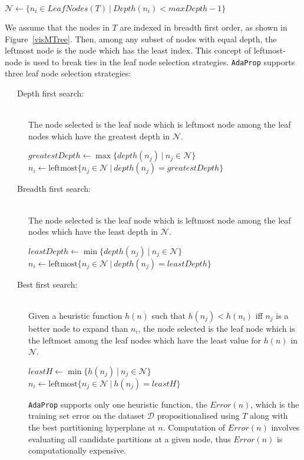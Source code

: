 \documentclass[a4paper,12pt]{report} %
\newcommand{\AdaProp}{\texttt{AdaProp}\xspace}
\newcommand{\mcl}[1]{\mathcal{#1}}
\begin{document}
\begin{algorithmic}
    \State $\mcl{N} \gets \{ n_i \in LeafNodes(T) ~\big|~ Depth(n_i) < maxDepth - 1 \} $
\end{algorithmic}


We assume that the nodes in $T$ are indexed in breadth first order, 
    as shown in Figure~\ref{visMTree}.
Then, among any subset of nodes with equal depth,
    the leftmost node is the node which has the least index.
This concept of leftmost-node is used to break ties in the 
    leaf node selection strategies.    
\AdaProp supports three leaf node selection strategies:
\pagebreak
\begin{description}
\item[~~~Depth first search:] \ \\
    The node selected is the leaf node 
    which is leftmost node among 
    the leaf nodes which have the greatest depth
    in $\mcl{N}$.
\begin{algorithmic}
    \State $ greatestDepth \gets \max\{ depth(n_j) ~\big|~ n_j \in \mcl{N} \} $
    \State $ n_i \gets \textrm{leftmost}\{ n_j \in \mcl{N} ~\big|~ depth(n_j) = greatestDepth \} $
\end{algorithmic}
        
\item[~~~Breadth first search:] \ \\
    The node selected is the leaf node 
    which is leftmost node among 
    the leaf nodes which have the least depth
    in $\mcl{N}$.
\begin{algorithmic}
    \State $ leastDepth \gets \min\{ depth(n_j) ~\big|~ n_j \in \mcl{N} \} $
    \State $ n_i \gets \textrm{leftmost}\{ n_j \in \mcl{N} ~\big|~ depth(n_j) = leastDepth \} $
\end{algorithmic}
    
\item[~~~Best first search:] \ \\
    Given a heuristic function $h(n)$ such that
    $h(n_j) < h(n_i)$ iff $n_j$ is a better node to expand than $n_i$,
    the node selected is the leaf node 
    which is the leftmost among 
    the leaf nodes which have the least value for $h(n)$
    in $\mcl{N}$.
\begin{algorithmic}
    \State $ leastH \gets \min\{ h(n_j) ~\big|~ n_j \in \mcl{N} \} $
    \State $ n_i \gets \textrm{leftmost}\{ n_j \in \mcl{N} ~\big|~ h(n_j) = leastH \} $
\end{algorithmic}

    \AdaProp supports only one heuristic function, 
        the $Error(n)$, which is the training set error 
        on the dataset $\mcl{D}$ propositionalised using $T$ along with 
        the best partitioning hyperplane at $n$.
     Computation of $Error(n)$ involves evaluating all candidate partitions at
     	a given node, 
         thus $Error(n)$ is computationally expensive.
    
\end{description}
\end{document}
